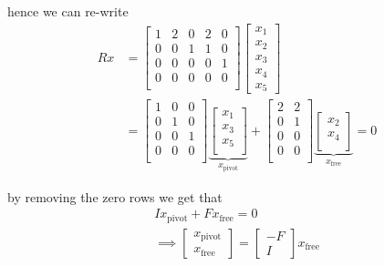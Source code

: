 \begin{example}
    hence we can re-write
    \begin{align*}
        Rx & = \begin{bmatrix}
            1 & 2 & 0 & 2 & 0 \\
            0 & 0 & 1 & 1 & 0 \\
            0 & 0 & 0 & 0 & 1 \\
            0 & 0 & 0 & 0 & 0 \\
        \end{bmatrix} \begin{bmatrix}
            x_1 \\
            x_2 \\
            x_3 \\
            x_4 \\
            x_5
        \end{bmatrix}                                                                                                                                \\
           & =\begin{bmatrix}
            1 & 0 & 0 \\
            0 & 1 & 0 \\
            0 & 0 & 1 \\
            0 & 0 & 0 \\
        \end{bmatrix} \underbrace{\begin{bmatrix}
                x_1 \\
                x_3 \\
                x_5 \\
            \end{bmatrix}}_{x_{\mathrm{pivot}}} + \begin{bmatrix}
            2 & 2 \\
            0 & 1 \\
            0 & 0 \\
            0 & 0 \\
        \end{bmatrix} \underbrace{ \begin{bmatrix}
                x_2 \\
                x_4 \\
            \end{bmatrix}}_{x_{\mathrm{free}}} = 0
    \end{align*}

    by removing the zero rows we get that
    \begin{align*}
        I x_{\mathrm{pivot}} + F x_{\mathrm{free}} = 0 \\
        \implies \begin{bmatrix}
            x_{\mathrm{pivot}} \\
            x_{\mathrm{free}}
        \end{bmatrix}
        = \begin{bmatrix}
            -F \\
            I
        \end{bmatrix}
        x_{\mathrm{free}}
    \end{align*}


\end{example}
